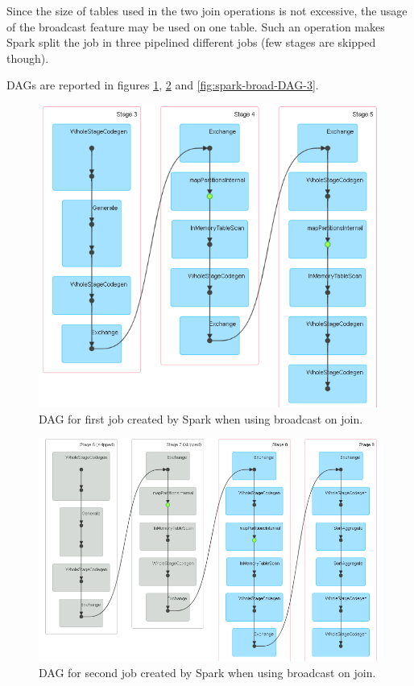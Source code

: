 Since the size of tables used in the two join operations is not excessive, the usage of the broadcast feature may be used on one table. Such an operation makes Spark split the job in three pipelined different jobs (few stages are skipped though).

DAGs are reported in figures \ref{fig:sspark-broad-DAG-1}, \ref{fig:spark-broad-DAG-2} and \ref{fig:spark-broad-DAG-3}.

\begin{figure}[H]
	\centering
	\includegraphics[scale=0.8]{images/3-spark/broad-DAG-1.png}
	\caption{DAG for first job created by Spark when using broadcast on join.}
	\label{fig:sspark-broad-DAG-1}
\end{figure}


\begin{figure}[H]
	\centering
	\includegraphics[scale=0.65]{images/3-spark/broad-DAG-2.png}
	\caption{DAG for second job created by Spark when using broadcast on join.}
	\label{fig:spark-broad-DAG-2}
\end{figure}


